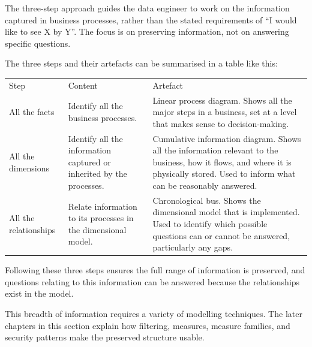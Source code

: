 \documentclass[10pt,openany,10pt]{book}
\newcounter{none}
\let\podeToprule\toprule
\let\podeMidrule\midrule
\let\podeBottomrule\bottomrule
\renewcommand{\toprule}{\arrayrulecolor{pbiGrid}\podeToprule}
\renewcommand{\midrule}{\arrayrulecolor{pbiGrid}\podeMidrule}
\renewcommand{\bottomrule}{\arrayrulecolor{pbiGrid}\podeBottomrule}
\begin{document}
The three-step approach guides the data engineer to work on the
information captured in business processes, rather than the stated
requirements of ``I would like to see X by Y''. The focus is on
preserving information, not on answering specific questions.

The three steps and their artefacts can be summarised in a table like
this:

{\def\LTcaptype{none} %
\begin{longtable}[]{@{}
  >{\raggedright\arraybackslash}p{}
  >{\raggedright\arraybackslash}p{}
  >{\raggedright\arraybackslash}p{}@{}}
\toprule\noalign{}
\begin{minipage}[b]{\linewidth}\raggedright
Step
\end{minipage} & \begin{minipage}[b]{\linewidth}\raggedright
Content
\end{minipage} & \begin{minipage}[b]{\linewidth}\raggedright
Artefact
\end{minipage} \\
\midrule\noalign{}
\endhead
\bottomrule\noalign{}
\endlastfoot
All the facts & Identify all the business processes. & Linear process
diagram. Shows all the major steps in a business, set at a level that
makes sense to decision-making. \\
All the dimensions & Identify all the information captured or inherited
by the processes. & Cumulative information diagram. Shows all the
information relevant to the business, how it flows, and where it is
physically stored. Used to inform what can be reasonably answered. \\
All the relationships & Relate information to its processes in the
dimensional model. & Chronological bus. Shows the dimensional model that
is implemented. Used to identify which possible questions can or cannot
be answered, particularly any gaps. \\
\end{longtable}
}

Following these three steps ensures the full range of information is
preserved, and questions relating to this information can be answered
because the relationships exist in the model.

This breadth of information requires a variety of modelling techniques.
The later chapters in this section explain how filtering, measures,
measure families, and security patterns make the preserved structure
usable.
\end{document}
